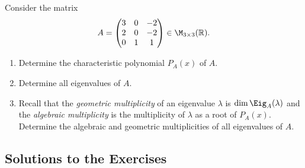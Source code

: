 \begin{exercise}
  \label{exc:multiplicities_3x3_matrix}
  Consider the matrix
  \[
  A = \begin{pmatrix}
    3 & 0 & -2 \\
    2 & 0 & -2 \\
    0 & 1 & 1
  \end{pmatrix} \in \M_{3 \times 3}(\mathbb{R}).
  \]
  \begin{enumerate}[label=\textbf{(\alph*)}]
    \item Determine the characteristic polynomial $P_A(x)$ of $A$.
    \item Determine all eigenvalues of $A$.
    \item Recall that the \emph{geometric multiplicity} of an eigenvalue $\lambda$ is $\dim \Eig_A(\lambda)$ and the \emph{algebraic multiplicity} is the multiplicity of $\lambda$ as a root of $P_A(x)$. Determine the algebraic and geometric multiplicities of all eigenvalues of $A$.
  \end{enumerate}
\end{exercise}

\subsection{Solutions to the Exercises}
\label{sec:solutions_multiplicities}

